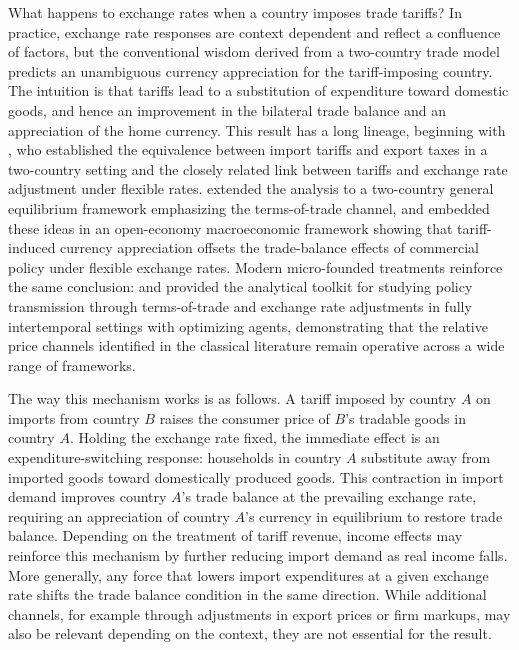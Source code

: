 \documentclass[11pt]{article}
\theoremstyle{plain}
\theoremstyle{remark}
\numberwithin{lemma}{section}
\numberwithin{proposition}{section}
\numberwithin{corollary}{section}
\begin{document}
What happens to exchange rates when a country imposes trade tariffs? In practice, exchange rate responses are context dependent and reflect a confluence of factors, but the conventional wisdom derived from a two-country trade model predicts an unambiguous currency appreciation for the tariff-imposing country. The intuition is that tariffs lead to a substitution of expenditure toward domestic goods, and hence an improvement in the bilateral trade balance and an appreciation of the home currency. This result has a long lineage, beginning with \cite{lerner1936symmetry}, who established the equivalence between import tariffs and export taxes in a two-country setting and the closely related link between tariffs and exchange rate adjustment under flexible rates. \cite{metzler1949tariffs} extended the analysis to a two-country general equilibrium framework emphasizing the terms-of-trade channel, and \cite{mundell1961flexible} embedded these ideas in an open-economy macroeconomic framework showing that tariff-induced currency appreciation offsets the trade-balance effects of commercial policy under flexible exchange rates. Modern micro-founded treatments reinforce the same conclusion: \cite{obstfeld1996foundations} and \cite{corsetti2001welfare} provided the analytical toolkit for studying policy transmission through terms-of-trade and exchange rate adjustments in fully intertemporal settings with optimizing agents, demonstrating that the relative price channels identified in the classical literature remain operative across a wide range of frameworks.

The way this mechanism works is as follows. A tariff imposed by country $A$ on imports from country $B$ raises the consumer price of $B$'s tradable goods in country $A$. Holding the exchange rate fixed, the immediate effect is an expenditure-switching response: households in country $A$ substitute away from imported goods toward domestically produced goods. This contraction in import demand improves country $A$'s trade balance at the prevailing exchange rate, requiring an appreciation of country $A$'s currency in equilibrium to restore trade balance. Depending on the treatment of tariff revenue, income effects may reinforce this mechanism by further reducing import demand as real income falls. More generally, any force that lowers import expenditures at a given exchange rate shifts the trade balance condition in the same direction. While additional channels, for example through adjustments in export prices or firm markups, may also be relevant depending on the context, they are not essential for the result.
\end{document}
